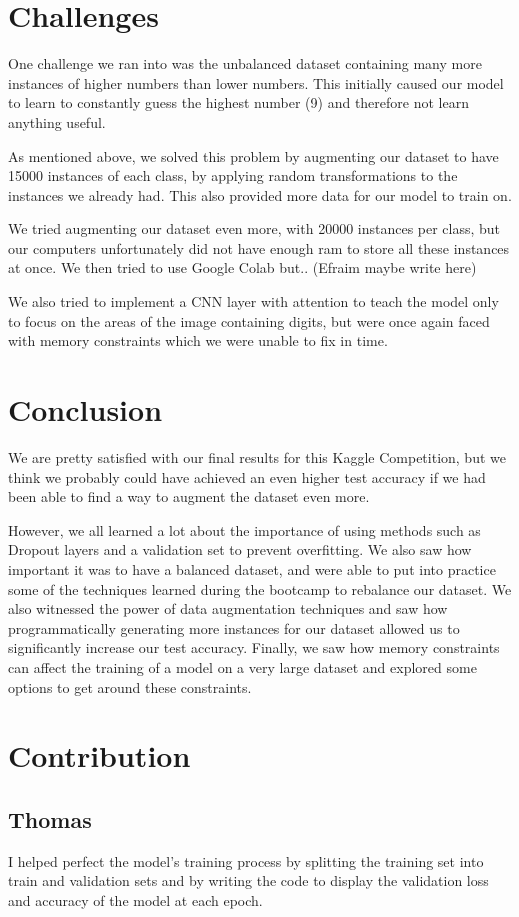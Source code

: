 \documentclass[12pt]{article}
\begin{document}
\section{Challenges}
One challenge we ran into was the unbalanced dataset containing many more instances of higher numbers than lower numbers. This initially caused our model to learn to constantly guess the highest number (9) and therefore not learn anything useful. 

As mentioned above, we solved this problem by augmenting our dataset to have 15000 instances of each class, by applying random transformations to the instances we already had. This also provided more data for our model to train on.

We tried augmenting our dataset even more, with 20000 instances per class, but our computers unfortunately did not have enough ram to store all these instances at once. We then tried to use Google Colab but.. (Efraim maybe write here)

We also tried to implement a CNN layer with attention to teach the model only to focus on the areas of the image containing digits, but were once again faced with memory constraints which we were unable to fix in time.
\section{Conclusion}
We are pretty satisfied with our final results for this Kaggle Competition, but we think we probably could have achieved an even higher test accuracy if we had been able to find a way to augment the dataset even more. 

However, we all learned a lot about the importance of using methods such as Dropout layers and a validation set to prevent overfitting. We also saw how important it was to have a balanced dataset, and were able to put into practice some of the techniques learned during the bootcamp to rebalance our dataset. We also witnessed the power of data augmentation techniques and saw how programmatically generating more instances for our dataset allowed us to significantly increase our test accuracy. Finally, we saw how memory constraints can affect the training of a model on a very large dataset and explored some options to get around these constraints.
\section{Contribution}

\subsection{Thomas}
I helped perfect the model's training process by splitting the training set into train and validation sets and by writing the code to display the validation loss and accuracy of the model at each epoch.
\end{document}
